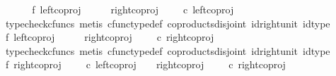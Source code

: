 \begin{isabellebody}
%
\isadelimproof
%
\endisadelimproof
%
\isatagproof
{}\isamarkupfalse%
\ {\isacharminus}{\kern0pt}\ \isanewline
\ \ \isamarkupfalse%
\ f{}{\isacharcolon}{\kern0pt}\ {\isachardoublequoteopen}left{\isacharunderscore}{\kern0pt}coproj\ {\isasymone}\ {\isacharparenleft}{\kern0pt}{\isasymone}\ {\isasymCoprod}\ {\isasymone}{\isacharparenright}{\kern0pt}\ {\isasymnoteq}\ right{\isacharunderscore}{\kern0pt}coproj\ {\isasymone}\ {\isacharparenleft}{\kern0pt}{\isasymone}\ {\isasymCoprod}\ {\isasymone}{\isacharparenright}{\kern0pt}\ {\isasymcirc}\isactrlsub c\ left{\isacharunderscore}{\kern0pt}coproj\ {\isasymone}\ {\isasymone}{\isachardoublequoteclose}\isanewline
\ \ \ \ \isamarkupfalse%
\ {\isacharparenleft}{\kern0pt}typecheck{\isacharunderscore}{\kern0pt}cfuncs{\isacharcomma}{\kern0pt}\ metis\ cfunc{\isacharunderscore}{\kern0pt}type{\isacharunderscore}{\kern0pt}def\ coproducts{\isacharunderscore}{\kern0pt}disjoint\ id{\isacharunderscore}{\kern0pt}right{\isacharunderscore}{\kern0pt}unit\ id{\isacharunderscore}{\kern0pt}type{\isacharparenright}{\kern0pt}\isanewline
\ \ \isamarkupfalse%
\ f{}{\isacharcolon}{\kern0pt}\ {\isachardoublequoteopen}left{\isacharunderscore}{\kern0pt}coproj\ {\isasymone}\ {\isacharparenleft}{\kern0pt}{\isasymone}\ {\isasymCoprod}\ {\isasymone}{\isacharparenright}{\kern0pt}\ {\isasymnoteq}\ right{\isacharunderscore}{\kern0pt}coproj\ {\isasymone}\ {\isacharparenleft}{\kern0pt}{\isasymone}\ {\isasymCoprod}\ {\isasymone}{\isacharparenright}{\kern0pt}\ {\isasymcirc}\isactrlsub c\ right{\isacharunderscore}{\kern0pt}coproj\ {\isasymone}\ {\isasymone}{\isachardoublequoteclose}\isanewline
\ \ \ \ \isamarkupfalse%
\ {\isacharparenleft}{\kern0pt}typecheck{\isacharunderscore}{\kern0pt}cfuncs{\isacharcomma}{\kern0pt}\ metis\ cfunc{\isacharunderscore}{\kern0pt}type{\isacharunderscore}{\kern0pt}def\ coproducts{\isacharunderscore}{\kern0pt}disjoint\ id{\isacharunderscore}{\kern0pt}right{\isacharunderscore}{\kern0pt}unit\ id{\isacharunderscore}{\kern0pt}type{\isacharparenright}{\kern0pt}\isanewline
\ \ \isamarkupfalse%
\ f{}{\isacharcolon}{\kern0pt}\ {\isachardoublequoteopen}right{\isacharunderscore}{\kern0pt}coproj\ {\isasymone}\ {\isacharparenleft}{\kern0pt}{\isasymone}\ {\isasymCoprod}\ {\isasymone}{\isacharparenright}{\kern0pt}\ {\isasymcirc}\isactrlsub c\ left{\isacharunderscore}{\kern0pt}coproj\ {\isasymone}\ {\isasymone}\ {\isasymnoteq}\ right{\isacharunderscore}{\kern0pt}coproj\ {\isasymone}\ {\isacharparenleft}{\kern0pt}{\isasymone}\ {\isasymCoprod}\ {\isasymone}{\isacharparenright}{\kern0pt}\ {\isasymcirc}\isactrlsub c\ right{\isacharunderscore}{\kern0pt}coproj\ {\isasymone}\ {\isasymone}{\isachardoublequoteclose}\isanewline

\end{isabellebody}
